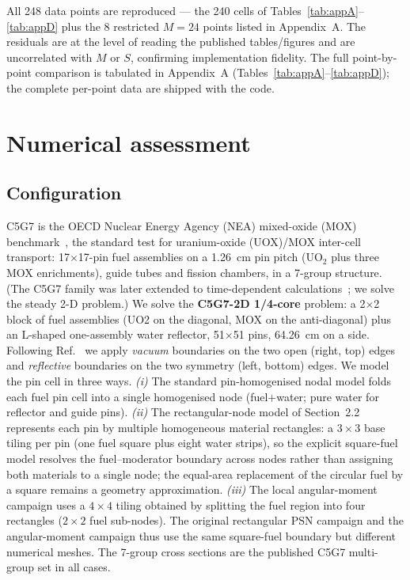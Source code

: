 \documentclass[11pt,a4paper]{article}
\begin{document}
All 248 data points are reproduced --- the 240 cells of
Tables~\ref{tab:appA}--\ref{tab:appD} plus the 8 restricted
$M{=}24$ points listed in Appendix~A. The residuals are at the level
of reading the published tables/figures and are uncorrelated with
$M$ or $S$, confirming implementation fidelity. The full point-by-point comparison is tabulated in
Appendix~A (Tables~\ref{tab:appA}--\ref{tab:appD}); the complete
per-point data are shipped with the code.

\section{Numerical assessment}

\subsection{Configuration}

C5G7 is the OECD Nuclear Energy Agency (NEA) mixed-oxide (MOX)
benchmark~\cite{nea2003,smith2004}, the standard test for uranium-oxide
(UOX)/MOX inter-cell transport: 17$\times$17-pin fuel assemblies on a
1.26~cm pin pitch (UO$_2$ plus three MOX enrichments), guide tubes and
fission chambers, in a 7-group structure. (The C5G7 family was later extended
to time-dependent calculations~\cite{c5g7td}; we solve the steady 2-D
problem.) We solve the \textbf{C5G7-2D 1/4-core} problem: a 2$\times$2 block
of fuel assemblies (UO2 on the diagonal, MOX on the anti-diagonal) plus an
L-shaped one-assembly water reflector, 51$\times$51 pins, 64.26~cm on a side.
Following Ref.~\cite{nea2003} we apply \emph{vacuum} boundaries on the two
open (right, top) edges and \emph{reflective} boundaries on the two symmetry
(left, bottom) edges. We model the pin cell in three ways. \emph{(i)} The standard
pin-homogenised nodal model folds each fuel pin cell into a single
homogenised node (fuel$+$water; pure water for reflector and guide
pins). \emph{(ii)} The rectangular-node model of Section~2.2 represents
each pin by multiple homogeneous material rectangles: a $3\times3$
base tiling per pin (one fuel square plus eight water strips), so the
explicit square-fuel model resolves the fuel--moderator boundary across
nodes rather than assigning both materials to a single node; the
equal-area replacement of the circular fuel by a square remains a
geometry approximation. \emph{(iii)} The local angular-moment campaign
uses a $4\times4$ tiling obtained by splitting the fuel region into
four rectangles ($2\times2$ fuel sub-nodes). The original rectangular PSN
campaign and the angular-moment campaign thus use the same square-fuel
boundary but different numerical meshes. The 7-group cross sections
are the published C5G7 multi-group set in all cases.
\end{document}
